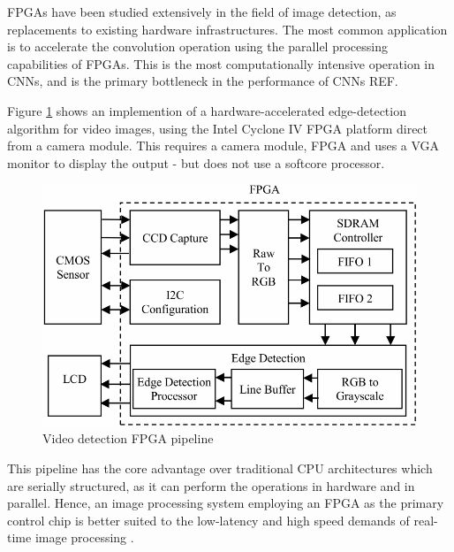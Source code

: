 FPGAs have been studied extensively in the field of image detection, as replacements to existing hardware infrastructures. 
The most common application is to accelerate the convolution operation using the parallel processing capabilities of FPGAs. 
This is the most computationally intensive operation in CNNs, and is the primary bottleneck in the performance of CNNs REF.

Figure \ref{fig:gradient} shows an implemention of a hardware-accelerated edge-detection algorithm for video images, using the Intel Cyclone IV FPGA platform direct from a camera module. 
This requires a camera module, FPGA and uses a VGA monitor to display the output - but does not use a softcore processor. 

\begin{figure}[h]
    \centering
    \includegraphics[width=1\textwidth]{Assets/Gradient.png}
    \caption{Video detection FPGA pipeline \cite{Gradient}}
    \label{fig:gradient}
\end{figure}

This pipeline has the core advantage over traditional CPU architectures which are serially structured, as it can perform the operations in hardware and in parallel. 
Hence, an image processing system employing an FPGA as the primary control chip is better suited to the low-latency and high speed demands of real-time image processing \cite{RTEdge}.